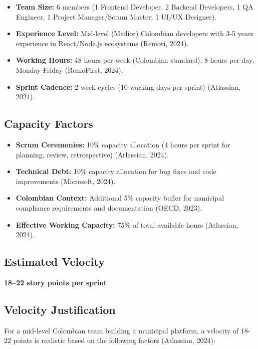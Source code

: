 \documentclass[12pt,a4paper]{article}
\begin{document}
\begin{itemize}
    \item \textbf{Team Size:} 6 members (1 Frontend Developer, 2 Backend Developers, 1 QA Engineer, 1 Project Manager/Scrum Master, 1 UI/UX Designer).
    \item \textbf{Experience Level:} Mid-level (Medior) Colombian developers with 3-5 years experience in React/Node.js ecosystems (Remoti, 2024).
    \item \textbf{Working Hours:} 48 hours per week (Colombian standard), 8 hours per day, Monday-Friday (RemoFirst, 2024).
    \item \textbf{Sprint Cadence:} 2-week cycles (10 working days per sprint) (Atlassian, 2024).
\end{itemize}

\subsection{Capacity Factors}

\begin{itemize}
    \item \textbf{Scrum Ceremonies:} 10\% capacity allocation (4 hours per sprint for planning, review, retrospective) (Atlassian, 2024).
    \item \textbf{Technical Debt:} 10\% capacity allocation for bug fixes and code improvements (Microsoft, 2024).
    \item \textbf{Colombian Context:} Additional 5\% capacity buffer for municipal compliance requirements and documentation (OECD, 2023).
    \item \textbf{Effective Working Capacity:} 75\% of total available hours (Atlassian, 2024).
\end{itemize}

\subsection{Estimated Velocity}

\textbf{18–22 story points per sprint}

\subsection{Velocity Justification}

For a mid-level Colombian team building a municipal platform, a velocity of 18-22 points is realistic based on the following factors (Atlassian, 2024):
\end{document}
